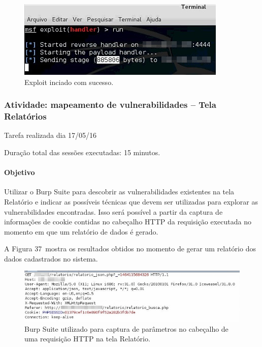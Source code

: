 \documentclass[
    12pt,               %
    openright,          %
    oneside,            %
    a4paper,            %
    section=TITLE,     %
    english,            %
    french,             %
    spanish,            %
    brazil              %
    ]{abntex2}
\begin{document}
\begin{figure}[htp]
\centering
\caption{Exploit inciado com sucesso.}
\includegraphics[width=378px]{image33.jpeg}
\end{figure}
\ifdefined\FloatBarrier \FloatBarrier \fi





\subsubsection*{Atividade: mapeamento de vulnerabilidades -- Tela Relatórios}

Tarefa realizada dia 17/05/16


Duração total das sessões executadas: 15 minutos.



\paragraph*{Objetivo}

Utilizar o Burp Suite para descobrir as vulnerabilidades existentes na tela Relatório e indicar as possíveis técnicas que devem ser utilizadas para explorar as vulnerabilidades encontradas. Isso será possível a partir da captura de informações de cookie contidas no cabeçalho HTTP da requisição executada no momento em que um relatório de dados é gerado.


A Figura 37~mostra os resultados obtidos no momento de gerar um relatório dos dados cadastrados no sistema.





\begin{figure}[htp]
\centering
\caption{Burp Suite utilizado para captura de parâmetros no cabeçalho de uma requisição HTTP na tela Relatório.}
\includegraphics[width=450px]{imagem34Editada.jpeg}
\end{figure}
\ifdefined\FloatBarrier \FloatBarrier \fi
\end{document}

